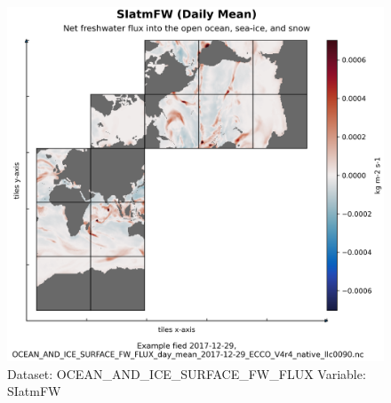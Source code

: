 \begin{figure}[H]
\centering
\includegraphics[scale=0.55]{../images/plots/native_plots/Ocean_and_Sea-Ice_Surface_Freshwater_Fluxes/SIatmFW.png}
\caption{Dataset: OCEAN\_AND\_ICE\_SURFACE\_FW\_FLUX Variable: SIatmFW}
\label{tab:table-OCEAN_AND_ICE_SURFACE_FW_FLUX_SIatmFW-Plot}
\end{figure}
\pagebreak

